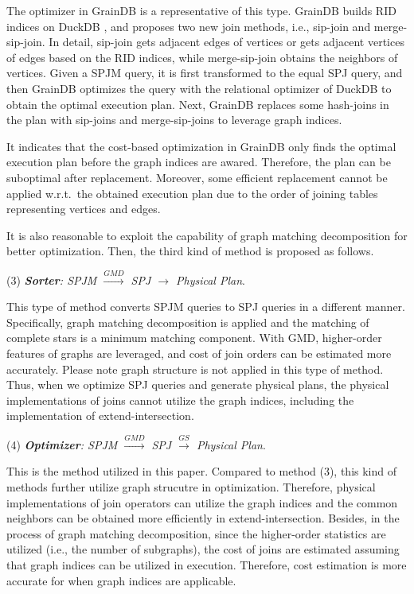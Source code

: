 The optimizer in GrainDB is a representative of this type.
GrainDB builds RID indices on DuckDB \cite{duckdb}, and proposes two new join methods, i.e., sip-join and merge-sip-join.
In detail, sip-join gets adjacent edges of vertices or gets adjacent vertices of edges based on the RID indices, while merge-sip-join obtains the neighbors of vertices.
Given a SPJM query, it is first transformed to the equal SPJ query, and then GrainDB optimizes the query with the relational optimizer of DuckDB to obtain the optimal execution plan.
Next, GrainDB replaces some hash-joins in the plan with sip-joins and merge-sip-joins to leverage graph indices.

It indicates that the cost-based optimization in GrainDB only finds the optimal execution plan before the graph indices are awared.
Therefore, the plan can be suboptimal after replacement.
Moreover, some efficient replacement cannot be applied w.r.t.~the obtained execution plan due to the order of joining tables representing vertices and edges.


It is also reasonable to exploit the capability of graph matching decomposition for better optimization.
Then, the third kind of method is proposed as follows.

(3) \emph{\textbf{Sorter}: SPJM $\xrightarrow{GMD}$ SPJ $\rightarrow$ Physical Plan}.

This type of method converts SPJM queries to SPJ queries in a different manner.
Specifically, graph matching decomposition is applied and the matching of complete stars is a minimum matching component.
With GMD, higher-order features of graphs are leveraged, and cost of join orders can be estimated more accurately.
Please note graph structure is not applied in this type of method.
Thus, when we optimize SPJ queries and generate physical plans, the physical implementations of joins cannot utilize the graph indices, including the implementation of extend-intersection.


(4) \emph{\textbf{Optimizer}: SPJM $\xrightarrow{GMD}$ SPJ $\xrightarrow{GS}$ Physical Plan}.

This is the method utilized in this paper.
Compared to method (3), this kind of methods further utilize graph strucutre in optimization.
Therefore, physical implementations of join operators can utilize the graph indices and the common neighbors can be obtained more efficiently in extend-intersection.
Besides, in the process of graph matching decomposition, since the higher-order statistics are utilized (i.e., the number of subgraphs), the cost of joins are estimated assuming that graph indices can be utilized in execution.
Therefore, cost estimation is more accurate for when graph indices are applicable.

